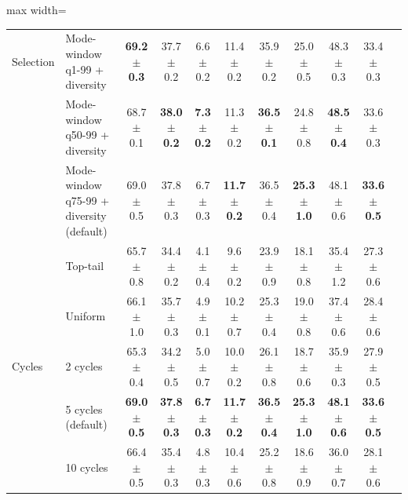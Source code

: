 \begin{table}[t]
\begin{adjustbox}{max width=\textwidth}
\begin{tabular}{l l c c c c c c c c c}
\midrule
Selection & Mode-window q1-99 + diversity & \textbf{69.2 {\scriptsize$\pm$ 0.3}} & 37.7 {\scriptsize$\pm$ 0.2} & 6.6 {\scriptsize$\pm$ 0.2} & 11.4 {\scriptsize$\pm$ 0.2} & 35.9 {\scriptsize$\pm$ 0.2} & 25.0 {\scriptsize$\pm$ 0.5} & 48.3 {\scriptsize$\pm$ 0.3} & 33.4 {\scriptsize$\pm$ 0.3} \\
 & Mode-window q50-99 + diversity & 68.7 {\scriptsize$\pm$ 0.1} & \textbf{38.0 {\scriptsize$\pm$ 0.2}} & \textbf{7.3 {\scriptsize$\pm$ 0.2}} & 11.3 {\scriptsize$\pm$ 0.2} & \textbf{36.5 {\scriptsize$\pm$ 0.1}} & 24.8 {\scriptsize$\pm$ 0.8} & \textbf{48.5 {\scriptsize$\pm$ 0.4}} & 33.6 {\scriptsize$\pm$ 0.3} \\
 & Mode-window q75-99 + diversity (default) & 69.0 {\scriptsize$\pm$ 0.5} & 37.8 {\scriptsize$\pm$ 0.3} & 6.7 {\scriptsize$\pm$ 0.3} & \textbf{11.7 {\scriptsize$\pm$ 0.2}} & 36.5 {\scriptsize$\pm$ 0.4} & \textbf{25.3 {\scriptsize$\pm$ 1.0}} & 48.1 {\scriptsize$\pm$ 0.6} & \textbf{33.6 {\scriptsize$\pm$ 0.5}} \\
 & Top-tail & 65.7 {\scriptsize$\pm$ 0.8} & 34.4 {\scriptsize$\pm$ 0.2} & 4.1 {\scriptsize$\pm$ 0.4} & 9.6 {\scriptsize$\pm$ 0.2} & 23.9 {\scriptsize$\pm$ 0.9} & 18.1 {\scriptsize$\pm$ 0.8} & 35.4 {\scriptsize$\pm$ 1.2} & 27.3 {\scriptsize$\pm$ 0.6} \\
 & Uniform & 66.1 {\scriptsize$\pm$ 1.0} & 35.7 {\scriptsize$\pm$ 0.3} & 4.9 {\scriptsize$\pm$ 0.1} & 10.2 {\scriptsize$\pm$ 0.7} & 25.3 {\scriptsize$\pm$ 0.4} & 19.0 {\scriptsize$\pm$ 0.8} & 37.4 {\scriptsize$\pm$ 0.6} & 28.4 {\scriptsize$\pm$ 0.6} \\
\midrule
Cycles & 2 cycles & 65.3 {\scriptsize$\pm$ 0.4} & 34.2 {\scriptsize$\pm$ 0.5} & 5.0 {\scriptsize$\pm$ 0.7} & 10.0 {\scriptsize$\pm$ 0.2} & 26.1 {\scriptsize$\pm$ 0.8} & 18.7 {\scriptsize$\pm$ 0.6} & 35.9 {\scriptsize$\pm$ 0.3} & 27.9 {\scriptsize$\pm$ 0.5} \\
 & 5 cycles (default) & \textbf{69.0 {\scriptsize$\pm$ 0.5}} & \textbf{37.8 {\scriptsize$\pm$ 0.3}} & \textbf{6.7 {\scriptsize$\pm$ 0.3}} & \textbf{11.7 {\scriptsize$\pm$ 0.2}} & \textbf{36.5 {\scriptsize$\pm$ 0.4}} & \textbf{25.3 {\scriptsize$\pm$ 1.0}} & \textbf{48.1 {\scriptsize$\pm$ 0.6}} & \textbf{33.6 {\scriptsize$\pm$ 0.5}} \\
 & 10 cycles & 66.4 {\scriptsize$\pm$ 0.5} & 35.4 {\scriptsize$\pm$ 0.3} & 4.8 {\scriptsize$\pm$ 0.3} & 10.4 {\scriptsize$\pm$ 0.6} & 25.2 {\scriptsize$\pm$ 0.8} & 18.6 {\scriptsize$\pm$ 0.9} & 36.0 {\scriptsize$\pm$ 0.7} & 28.1 {\scriptsize$\pm$ 0.6} \\

\end{tabular}
\end{adjustbox}
\end{table}
